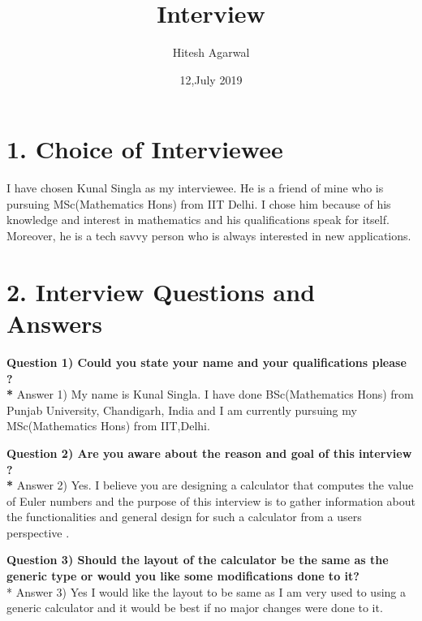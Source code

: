 \documentclass{article}
\begin{document}
\title{Interview}
\author{Hitesh Agarwal }
\date{12,July 2019}
\maketitle



\section*{1. Choice of Interviewee}

\noindent I have chosen Kunal Singla as my interviewee. He is a friend of mine who is pursuing MSc(Mathematics Hons) from IIT Delhi.
\noindent I chose him because of his knowledge and interest in mathematics and his qualifications speak for itself. Moreover, he is a tech savvy person who is always interested in new applications.

\section*{2. Interview Questions and Answers}
\noindent \textbf {Question 1) Could you state your name and your qualifications please ?\\*}
\noindent Answer 1) My name is Kunal Singla. I have done BSc(Mathematics Hons) from Punjab University, Chandigarh, India and I am currently pursuing my MSc(Mathematics Hons) from IIT,Delhi.
\begin{flushleft}
\hrulefill
\end{flushleft}

\noindent \textbf{Question 2) Are you aware about the reason and goal of this interview ?\\*}
\noindent Answer 2) Yes. I believe you are designing a calculator that computes the value of Euler numbers and the purpose of this interview is to gather information about the functionalities and general design for such a calculator from a users perspective .

\begin{flushleft}
\hrulefill
\end{flushleft}
\noindent \textbf{Question 3) Should the layout of the calculator be the same as the generic type or would you like some modifications done to it?}\\*
\noindent Answer 3) Yes I would like the layout to be same as I am very used to using a generic calculator and it would be best if no major changes were done to it. 
\begin{flushleft}
\hrulefill
\end{flushleft}
\end{document}
